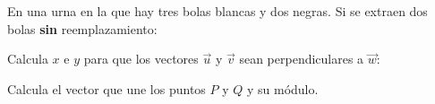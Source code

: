 \documentclass[addpoints,spanish, 12pt,a4paper]{exam}
\begin{document}
\begin{questions}



\question En una urna en la que hay tres bolas blancas y dos negras. Si se extraen dos bolas \textbf{sin} reemplazamiento:

\question Calcula $x$ e $y$ para que los vectores $\overrightarrow{u}$ y $\overrightarrow{v}$ sean perpendiculares a $\overrightarrow{w}$:

\question Calcula el vector que une los puntos $P$ y $Q$ y su módulo.\begin{parts} 

\end{parts}
\end{questions}
\end{document}
